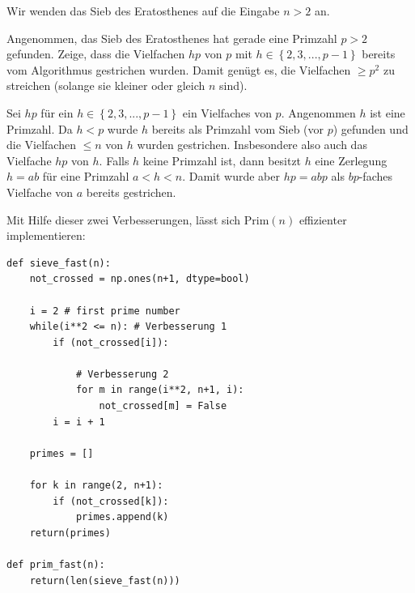 \begin{Exercise}
Wir wenden das Sieb des Eratosthenes auf die Eingabe $n>2$ an.

Angenommen, das Sieb des Eratosthenes hat gerade eine Primzahl $p > 2$ gefunden. Zeige, dass die Vielfachen $hp$ von $p$ mit $h\in \left\{2,3, ..., p-1\right\}$ bereits vom Algorithmus gestrichen wurden. Damit genügt es, die Vielfachen $\geq p^2$ zu streichen (solange sie kleiner oder gleich $n$ sind).
\end{Exercise}

\begin{Answer}
Sei $hp$ für ein $h\in \left\{2,3, ..., p-1\right\}$ ein Vielfaches von $p$. Angenommen $h$ ist eine Primzahl. Da $h<p$ wurde $h$ bereits als Primzahl vom Sieb (vor $p$) gefunden und die Vielfachen $\leq n$ von $h$ wurden gestrichen. Insbesondere also auch das Vielfache $hp$ von $h$. Falls $h$ keine Primzahl ist, dann besitzt $h$ eine Zerlegung $h = ab$ für eine Primzahl $a<h<n$. Damit wurde aber $hp = abp$ als $bp$-faches Vielfache von $a$ bereits gestrichen.
\end{Answer}

\clearpage

Mit Hilfe dieser zwei Verbesserungen, lässt sich $\text{Prim}(n)$ effizienter implementieren:
\begin{verbatim}
def sieve_fast(n):
    not_crossed = np.ones(n+1, dtype=bool)

    i = 2 # first prime number
    while(i**2 <= n): # Verbesserung 1
        if (not_crossed[i]):

            # Verbesserung 2
            for m in range(i**2, n+1, i):
                not_crossed[m] = False
        i = i + 1

    primes = []

    for k in range(2, n+1):
        if (not_crossed[k]):
            primes.append(k)
    return(primes)

def prim_fast(n):
    return(len(sieve_fast(n)))
\end{verbatim}


